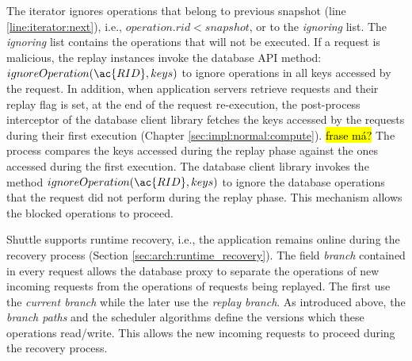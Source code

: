 The iterator ignores operations that belong to previous snapshot (line \ref{line:iterator:next}), i.e., $operation.rid < snapshot$, or to the \emph{ignoring} list. The \emph{ignoring} list contains the operations that will not be executed. If a request is malicious, the replay instances invoke the database \ac{API} method: $ignoreOperation(\ac{RID},keys)$ to ignore operations in all keys accessed by the request. In addition, when application servers retrieve requests and their replay flag is set, at the end of the request re-execution, the post-process interceptor of the database client library fetches the keys accessed by the requests during their first execution (Chapter \ref{sec:impl:normal:compute}). \hl{frase má?} The process compares the keys accessed during the replay phase against the ones accessed during the first execution. The database client library invokes the method $ignoreOperation(\ac{RID},keys)$ to ignore the database operations that the request did not perform during the replay phase. This mechanism allows the blocked operations to proceed.



Shuttle supports runtime recovery, i.e., the application remains online during the recovery process (Section \ref{sec:arch:runtime_recovery}). The field \emph{branch} contained in every request allows the database proxy to separate the operations of new incoming requests from the operations of requests being replayed. The first use the \emph{current branch} while the later use the \emph{replay branch}. As introduced above, the \emph{branch paths} and the scheduler algorithms define the versions which these operations read/write. This allows the new incoming requests to proceed during the recovery process.

